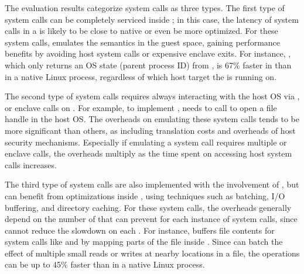 

The evaluation results categorize
system calls as three types.
The first type of system calls can be completely serviced inside \thelibos{};
in this case, the latency of system calls
in a \picoproc{}
is likely to be close to native
or even be more optimized.
For these system calls,
\thelibos{} emulates the semantics
in the guest space,
gaining performance benefits
by avoiding host system calls or expensive enclave exits.
For instance,
, which only returns an OS state
(parent process ID) from \thelibos{},
is 67\% faster in \graphene{} than in a native Linux process,
regardless of which host target
the \libos{} is running on.


The second type of system calls
requires
always interacting with the host OS via \thehostabi{},
or enclave calls on \sgx{}.
For example, to implement , \thelibos{} needs to call  to open a file handle in the host OS.
The overheads on emulating these system calls
tends to be more significant
than others, as including translation costs and overheads of host security mechanisms.
Especially if emulating a system call
requires multiple \hostapis{}
or enclave calls,
the overheads multiply as the time spent on accessing host system calls increases.



The third type of system calls are also implemented
with the involvement
of \hostapis{}, but can benefit from optimizations inside \libos{}, using techniques
such as \hostapi{} batching, I/O buffering,
and directory caching. 
For these system calls,
the overheads generally depend on
the number of \hostapis{}
that \thelibos{} can prevent for each instance of system calls,
since \thelibos{}
cannot reduce the slowdown on each \hostapi{}.
For instance,
\thelibos{} buffers file contents for system calls like  and 
by mapping parts of the file inside \picoprocs{}.
Since \thelibos{}
can batch the effect of multiple small reads or writes
at nearby locations in a file,
the operations
can be up to \roughly{}45\% faster than in a native Linux process.  


